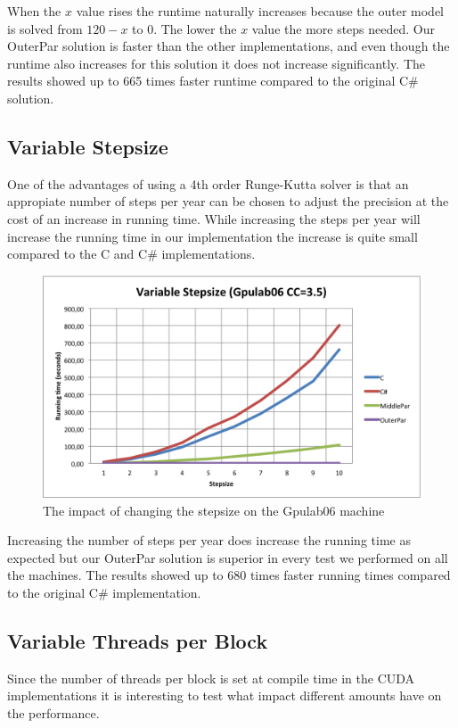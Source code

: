 When the $x$ value rises the runtime naturally increases because the outer model is solved from $120-x$ to 0. The lower the $x$ value the more steps needed. Our OuterPar solution is faster than the other implementations, and even though the runtime also increases for this solution it does not increase significantly. The results showed up to 665 times faster runtime compared to the original C\# solution.

\subsection{Variable Stepsize}
One of the advantages of using a 4th order Runge-Kutta solver is that an appropiate number of steps per year can be chosen to adjust the precision at the cost of an increase in running time. While increasing the steps per year will increase the running time in our implementation the increase is quite small compared to the C and C\# implementations.

\begin{figure}[t]
\begin{center}
	\includegraphics[scale=0.5]{img/Gpulab-stepsize35.png}
\end{center}
\caption{The impact of changing the stepsize on the Gpulab06 machine}
\label{variablestepsize}
\end{figure}
\FloatBarrier
Increasing the number of steps per year does increase the running time as expected but our OuterPar solution is superior in every test we performed on all the machines. The results showed up to 680 times faster running times compared to the original C\# implementation.

\subsection{Variable Threads per Block}
Since the number of threads per block is set at compile time in the CUDA implementations it is interesting to test what impact different amounts have on the performance.

